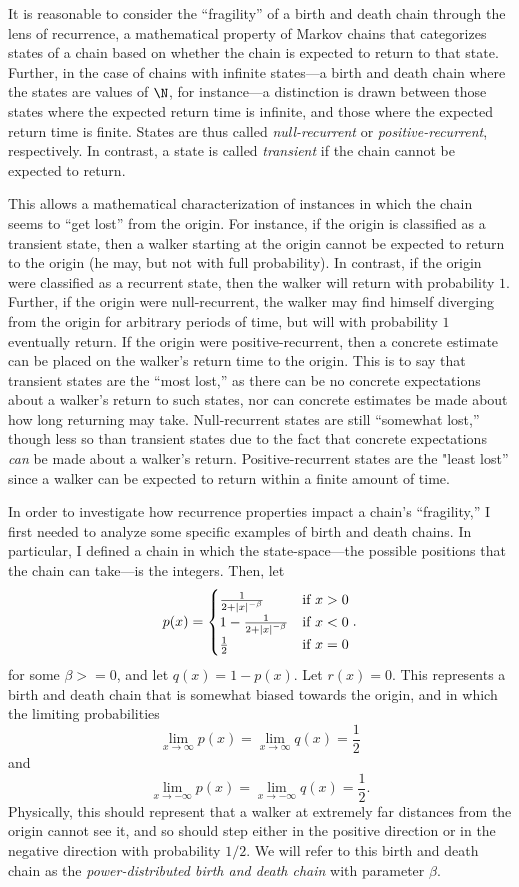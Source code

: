 It is reasonable to consider the ``fragility'' of a birth and death chain through the lens of
recurrence, a mathematical property of Markov chains that categorizes states of a chain based on whether
the chain is expected to return to that state. Further, in the case of chains with infinite states---a
birth and death chain where the states are values of $\N$, for instance---a distinction is drawn between
those states where the expected return time is infinite, and those where the expected return time is
finite.  States are thus called \emph{null-recurrent} or \emph{positive-recurrent}, respectively. In
contrast, a state is called \emph{transient} if the chain cannot be expected to return.

This allows a mathematical characterization of instances in which the chain seems to ``get lost'' from
the origin. For instance, if the origin is classified as a transient state, then a walker starting at
the origin cannot be expected to return to the origin (he may, but not with full probability). In
contrast, if the origin were classified as a recurrent state, then the walker will return with
probability $1$.  Further, if the origin were null-recurrent, the walker may find himself diverging from
the origin for arbitrary periods of time, but will with probability $1$ eventually return. If the origin
were positive-recurrent, then a concrete estimate can be placed on the walker's return time to the
origin.  This is to say that transient states are the ``most lost,'' as there can be no concrete
expectations about a walker's return to such states, nor can concrete estimates be made about how long
returning may take.  Null-recurrent states are still ``somewhat lost,'' though less so than transient
states due to the fact that concrete expectations \emph{can} be made about a walker's return.
Positive-recurrent states are the "least lost'' since a walker can be expected to return within a finite
amount of time.

In order to investigate how recurrence properties impact a chain's ``fragility,'' I first needed to
analyze some specific examples of birth and death chains. In particular, I defined a chain in which the
state-space---the possible positions that the chain can take---is the integers. Then, let
\[
    p(x) = \begin{cases}
        \frac{1}{2+\left\vert x \right\vert^{-\beta}} & \text{if } x > 0 \\
        1 - \frac{1}{2+\left\vert x \right\vert^{-\beta}} & \text{if } x < 0 \\
        \frac{1}{2} & \text{if } x = 0
    \end{cases}.
\]
for some $\beta >= 0$, and let $q(x) = 1 - p(x)$. Let $r(x) = 0$. This represents a birth and death
chain that is somewhat biased towards the origin, and in which the limiting probabilities
\[
    \lim_{x \to \infty} p(x) = \lim_{x \to \infty} q(x) = \frac{1}{2}  
\]
and
\[
    \lim_{x \to -\infty} p(x) = \lim_{x \to -\infty} q(x) = \frac{1}{2}.  
\]
Physically, this should represent that a walker at extremely far distances from the origin cannot see
it, and so should step either in the positive direction or in the negative direction with probability
$1/2$. We will refer to this birth and death chain as the \emph{power-distributed birth and death chain}
with parameter $\beta$.

